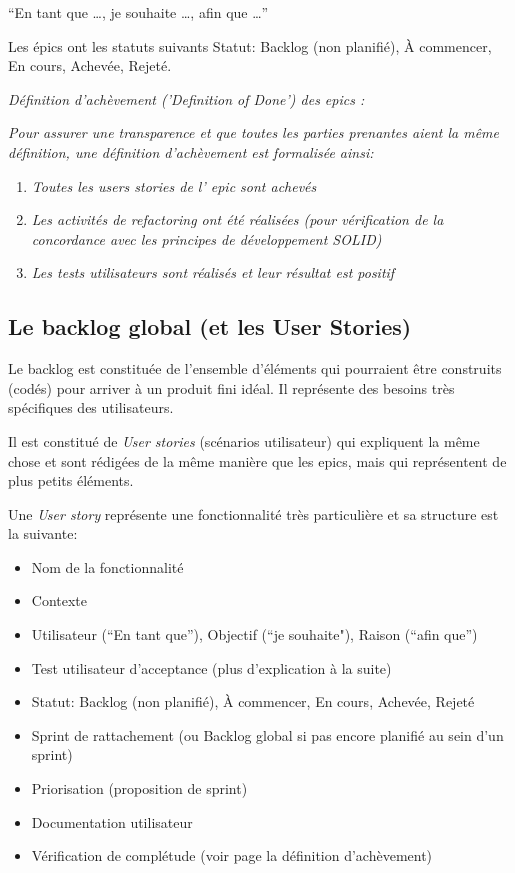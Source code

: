 “En tant que …, je souhaite …, afin que …” 

Les épics ont les statuts suivants Statut: Backlog (non planifié), À commencer, En cours, Achevée, Rejeté.\\



\noindent%
\hfill%
\begin{minipage}{12cm}
      \textsl{Définition d'achèvement ('Definition of Done') des epics :}

      \textsl{Pour assurer une transparence et que toutes les parties prenantes aient la même définition, 
une définition d'achèvement est formalisée ainsi:}
\begin{enumerate}     
      \item  \textsl{Toutes les users stories de l' epic sont achevés}
      \item  \textsl{Les activités de refactoring ont été réalisées (pour vérification de la concordance 
      avec les principes de développement SOLID)}
      \item  \textsl{Les tests utilisateurs sont réalisés et leur résultat est positif}
\end{enumerate}
\end{minipage}

\subsection{Le backlog global (et les User Stories)}

Le backlog est constituée de l’ensemble d'éléments qui pourraient être construits (codés) pour arriver 
à un produit fini idéal. Il représente des besoins très spécifiques des utilisateurs. 

Il est constitué de \emph{User stories} (scénarios utilisateur) qui expliquent la même chose et 
sont rédigées de la même manière que les epics, mais qui représentent de plus petits éléments.

Une \emph{User story} représente une fonctionnalité très particulière et sa structure est la suivante:

\begin{itemize}
      \item Nom de la fonctionnalité
      \item Contexte
      \item Utilisateur (“En tant que”), Objectif (“je souhaite"), Raison (“afin que”)
      \item Test utilisateur d’acceptance (plus d’explication à la suite) %
      \item Statut: Backlog (non planifié), À commencer, En cours, Achevée, Rejeté
      \item Sprint de rattachement (ou Backlog global si pas encore planifié au sein d’un sprint)
      \item Priorisation (proposition de sprint)
      \item Documentation utilisateur
      \item Vérification de complétude (voir page \pageref{DefofDoneUS} la définition d'achèvement)
\end{itemize}

